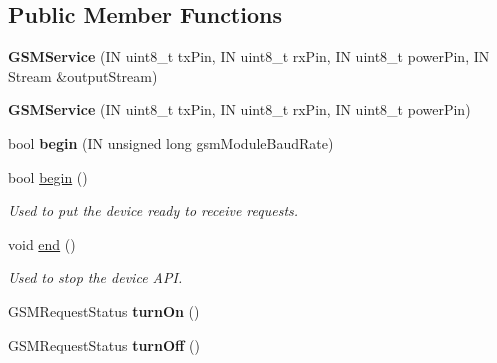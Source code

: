 \subsection*{Public Member Functions}
\begin{DoxyCompactItemize}
\item 
\mbox{\label{class_easyuino_1_1_g_s_m_service_ad8700c921a8f3ce267369e9843853be1}} 
{\bfseries G\+S\+M\+Service} (IN uint8\+\_\+t tx\+Pin, IN uint8\+\_\+t rx\+Pin, IN uint8\+\_\+t power\+Pin, IN Stream \&output\+Stream)
\item 
\mbox{\label{class_easyuino_1_1_g_s_m_service_ab856f1ecdb47de6b13f186bea7c69ce2}} 
{\bfseries G\+S\+M\+Service} (IN uint8\+\_\+t tx\+Pin, IN uint8\+\_\+t rx\+Pin, IN uint8\+\_\+t power\+Pin)
\item 
\mbox{\label{class_easyuino_1_1_g_s_m_service_a49dd695dba030b168464f620c3d96ee0}} 
bool {\bfseries begin} (IN unsigned long gsm\+Module\+Baud\+Rate)
\item 
bool \hyperlink{class_easyuino_1_1_g_s_m_service_aeafc2dae47e4b13e127eb228a0f7ff6a}{begin} ()
\begin{DoxyCompactList}\small\item\em Used to put the device ready to receive requests. \end{DoxyCompactList}\item 
void \hyperlink{class_easyuino_1_1_g_s_m_service_a05bef783773776ec209608aa81d1ff45}{end} ()
\begin{DoxyCompactList}\small\item\em Used to stop the device A\+PI. \end{DoxyCompactList}\item 
\mbox{\label{class_easyuino_1_1_g_s_m_service_ad5bd54c7dfcc402df0fac92c88e07c6e}} 
G\+S\+M\+Request\+Status {\bfseries turn\+On} ()
\item 
\mbox{\label{class_easyuino_1_1_g_s_m_service_a327c2610c2aa7ba5a54530d87a0d6128}} 
G\+S\+M\+Request\+Status {\bfseries turn\+Off} ()
\item 
\mbox{\label{class_easyuino_1_1_g_s_m_service_a2ad440efbd04942d956212988d20a0df}} 

\end{DoxyCompactItemize}
